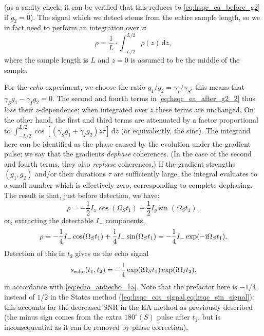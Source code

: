 (as a sanity check, it can be verified that this reduces to \cref{eq:hsqc_ea_before_g2} if $g_2 = 0$).
The signal which we detect stems from the entire sample length, so we in fact need to perform an integration over $z$:
\begin{equation}
    \label{eq:density_operator_integration}
    \rho = \frac{1}{L} \cdot \int_{-L/2}^{L/2} \rho(z) \,\mathrm{d}z,
\end{equation}
where the sample length is $L$ and $z=0$ is assumed to be the middle of the sample.

For the \textit{echo} experiment, we choose the ratio $g_1/g_2 = \gamma_I/\gamma_S$; this means that $\gamma_S g_1 - \gamma_I g_2 = 0$.
The second and fourth terms in \cref{eq:hsqc_ea_after_g2_2} thus \textit{lose} their $z$-dependence; when integrated over $z$ these terms are unchanged.
On the other hand, the first and third terms are attenuated by a factor proportional to $\int_{-L/2}^{L/2} \cos[(\gamma_S g_1 + \gamma_I g_2)z\tau]\,\mathrm{d}z$ (or equivalently, the sine).
The integrand here can be identified as the phase caused by the evolution under the gradient pulse; we say that the gradients \textit{dephase} coherences. (In the case of the second and fourth terms, they also \textit{rephase} coherences.)
If the gradient strengths $(g_1, g_2)$ and/or their durations $\tau$ are sufficiently large, the integral evaluates to a small number which is effectively zero, corresponding to complete dephasing.
The result is that, just before detection, we have:
\begin{equation}
    \label{eq:hsqc_ea_echo_cartesian}
    \rho = -\frac{1}{2}I_x\cos(\Omega_S t_1) + \frac{1}{2}I_y\sin(\Omega_S t_1),
\end{equation}
or, extracting the detectable $I_-$ components,
\begin{equation}
    \label{eq:hsqc_ea_echo_detectable}
    \rho = -\frac{1}{4}I_-\cos(\Omega_S t_1) + \frac{\mathrm{i}}{4}I_-\sin(\Omega_S t_1) = -\frac{1}{4}I_-\exp(-\mathrm{i}\Omega_S t_1).
\end{equation}
Detection of this in $t_2$ gives us the echo signal
\begin{equation}
    \label{eq:hsqc_ea_echo_signal}
    s_\text{echo}(t_1, t_2) = -\frac{1}{4}\exp(\mathrm{i} \Omega_S t_1)\exp(\mathrm{i} \Omega_I t_2),
\end{equation}
in accordance with \cref{eq:echo_antiecho_1a}.
Note that the prefactor here is $-1/4$, instead of $1/2$ in the States method (\cref{eq:hsqc_cos_signal,eq:hsqc_sin_signal}): this accounts for the decreased SNR in the EA method as previously described (the minus sign comes from the extra $180^\circ(S)$ pulse after $t_1$, but is inconsequential as it can be removed by phase correction).


